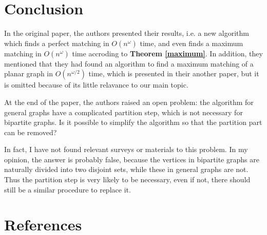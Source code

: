 \documentclass{article}
\begin{document}
	\section{Conclusion}

		In the original paper, the authors presented their results, i.e. a new algorithm which finds a perfect matching in $O(n^\omega)$ time, and even finds a maximum matching in $O(n^\omega)$ time accroding to {\bfseries Theorem \ref{maximum}}. In addition, they mentioned that they had found an algorithm to find a maximum matching of a planar graph in $O(n^{\omega / 2})$ time, which is presented in their another paper, but it is omitted because of its little relavance to our main topic.

		At the end of the paper, the authors raised an open problem: the algorithm for general graphs have a complicated partition step, which is not necessary for bipartite graphs. Is it possible to simplify the algorithm so that the partition part can be removed?
		
		In fact, I have not found relevant surveys or materials to this problem. In my opinion, the answer is probably false, because the vertices in bipartite graphs are naturally divided into two disjoint sets, while these in general graphs are not. Thus the partition step is very likely to be necessary, even if not, there should still be a similar procedure to replace it.

	\section*{References}
		\medskip
		
\end{document}
